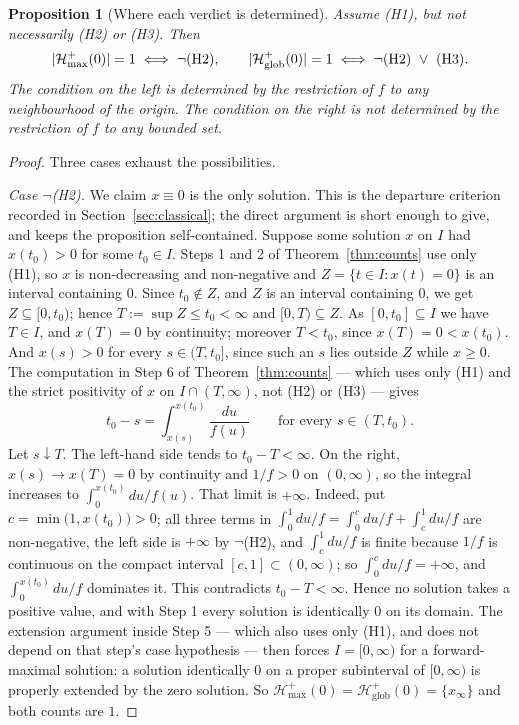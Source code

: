 \documentclass[12pt]{article}
\theoremstyle{plain}
\newtheorem{proposition}[theorem]{Proposition}
\theoremstyle{definition}
\theoremstyle{remark}
\newcommand{\Hglob}{\mathcal{H}^{+}_{\mathrm{glob}}}
\newcommand{\Hmax}{\mathcal{H}^{+}_{\max}}
\begin{document}
\begin{proposition}[Where each verdict is determined]\label{prop:locality}
Assume \textup{(H1)}, but not necessarily \textup{(H2)} or \textup{(H3)}. Then
\[
  |\Hmax(0)|=1 \iff \neg\textup{(H2)},
  \qquad
  |\Hglob(0)|=1 \iff \neg\textup{(H2)}\ \vee\ \textup{(H3)} .
\]
The condition on the left is determined by the restriction of $f$ to any
neighbourhood of the origin. The condition on the right is not determined by the
restriction of $f$ to any bounded set.
\end{proposition}

\begin{proof}
Three cases exhaust the possibilities.

\smallskip
\emph{Case $\neg$\textup{(H2)}.} We claim $x\equiv0$ is the only solution. This
is the departure criterion recorded in Section~\ref{sec:classical}; the direct
argument is short enough to give, and keeps the proposition self-contained.
Suppose some solution $x$ on $I$ had $x(t_{0})>0$ for some $t_{0}\in I$. Steps 1
and 2 of Theorem~\ref{thm:counts} use only (H1), so $x$ is non-decreasing and
non-negative and $Z=\{t\in I:x(t)=0\}$ is an interval containing $0$. Since
$t_{0}\notin Z$, and $Z$ is an interval containing $0$, we get
$Z\subseteq[0,t_{0})$; hence $T:=\sup Z\le t_{0}<\infty$ and
$[0,T)\subseteq Z$. As $[0,t_{0}]\subseteq I$ we have $T\in I$, and $x(T)=0$ by
continuity; moreover $T<t_{0}$, since $x(T)=0<x(t_{0})$. And $x(s)>0$ for every
$s\in(T,t_{0}]$, since such an $s$ lies outside $Z$ while $x\ge0$. The computation in Step 6 of
Theorem~\ref{thm:counts} --- which uses only (H1) and the strict positivity of
$x$ on $I\cap(T,\infty)$, not (H2) or (H3) --- gives
\[
  t_{0}-s=\int_{x(s)}^{x(t_{0})}\frac{du}{f(u)}
  \qquad\text{for every } s\in(T,t_{0}) .
\]
Let $s\downarrow T$. The left-hand side tends to $t_{0}-T<\infty$. On the right,
$x(s)\to x(T)=0$ by continuity and $1/f>0$ on $(0,\infty)$, so the integral
increases to $\int_{0}^{x(t_{0})}du/f(u)$. That limit is $+\infty$. Indeed, put
$c=\min\big(1,x(t_{0})\big)>0$; all three terms in
$\int_{0}^{1}du/f=\int_{0}^{c}du/f+\int_{c}^{1}du/f$ are non-negative, the left
side is $+\infty$ by $\neg$(H2), and $\int_{c}^{1}du/f$ is finite because $1/f$
is continuous on the compact interval $[c,1]\subset(0,\infty)$; so
$\int_{0}^{c}du/f=+\infty$, and $\int_{0}^{x(t_{0})}du/f$ dominates it. This
contradicts $t_{0}-T<\infty$. Hence no solution takes a positive value, and with
Step 1 every solution is identically $0$ on its domain. The extension argument
inside Step 5 --- which also uses only (H1), and does not depend on that step's
case hypothesis --- then forces $I=[0,\infty)$ for a forward-maximal solution:
a solution identically $0$ on a proper subinterval of $[0,\infty)$ is properly
extended by the zero solution. So
$\Hmax(0)=\Hglob(0)=\{x_{\infty}\}$ and both counts are $1$.


\end{proof}
\end{document}
